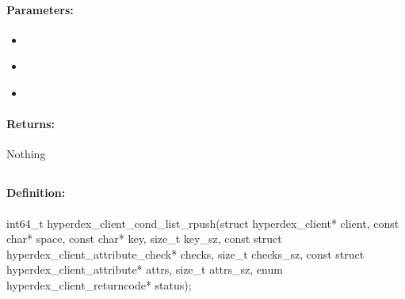 \paragraph{Parameters:}
\begin{itemize}[noitemsep]
\item {}\\

\item {}\\

\item {}\\

\end{itemize}

\paragraph{Returns:}
Nothing
\pagebreak
\subsection{}
\label{api:c:cond_list_rpush}


\paragraph{Definition:}
\begin{ccode}
int64_t hyperdex_client_cond_list_rpush(struct hyperdex_client* client,
        const char* space,
        const char* key, size_t key_sz,
        const struct hyperdex_client_attribute_check* checks, size_t checks_sz,
        const struct hyperdex_client_attribute* attrs, size_t attrs_sz,
        enum hyperdex_client_returncode* status);
\end{ccode}


